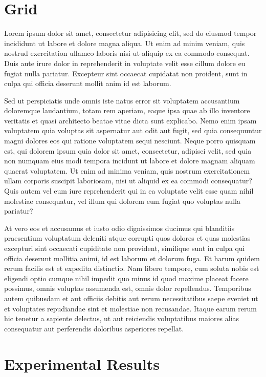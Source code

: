 \documentclass[ijoc,nonblindrev]{informs3} %
\begin{document}
\section{Grid}

Lorem ipsum dolor sit amet, consectetur adipisicing elit, sed do eiusmod
tempor incididunt ut labore et dolore magna aliqua. Ut enim ad minim
veniam, quis nostrud exercitation ullamco laboris nisi ut aliquip ex ea
commodo consequat. Duis aute irure dolor in reprehenderit in voluptate
velit esse cillum dolore eu fugiat nulla pariatur. Excepteur sint
occaecat cupidatat non proident, sunt in culpa qui officia deserunt
mollit anim id est laborum.

Sed ut perspiciatis unde omnis iste natus error sit voluptatem
accusantium doloremque laudantium, totam rem aperiam, eaque ipsa quae ab
illo inventore veritatis et quasi architecto beatae vitae dicta sunt
explicabo. Nemo enim ipsam voluptatem quia voluptas sit aspernatur aut
odit aut fugit, sed quia consequuntur magni dolores eos qui ratione
voluptatem sequi nesciunt. Neque porro quisquam est, qui dolorem ipsum
quia dolor sit amet, consectetur, adipisci velit, sed quia non numquam
eius modi tempora incidunt ut labore et dolore magnam aliquam quaerat
voluptatem. Ut enim ad minima veniam, quis nostrum exercitationem ullam
corporis suscipit laboriosam, nisi ut aliquid ex ea commodi consequatur?
Quis autem vel eum iure reprehenderit qui in ea voluptate velit esse
quam nihil molestiae consequatur, vel illum qui dolorem eum fugiat quo
voluptas nulla pariatur?

At vero eos et accusamus et iusto odio dignissimos ducimus qui
blanditiis praesentium voluptatum deleniti atque corrupti quos dolores
et quas molestias excepturi sint occaecati cupiditate non provident,
similique sunt in culpa qui officia deserunt mollitia animi, id est
laborum et dolorum fuga. Et harum quidem rerum facilis est et expedita
distinctio. Nam libero tempore, cum soluta nobis est eligendi optio
cumque nihil impedit quo minus id quod maxime placeat facere possimus,
omnis voluptas assumenda est, omnis dolor repellendus. Temporibus autem
quibusdam et aut officiis debitis aut rerum necessitatibus saepe eveniet
ut et voluptates repudiandae sint et molestiae non recusandae. Itaque
earum rerum hic tenetur a sapiente delectus, ut aut reiciendis
voluptatibus maiores alias consequatur aut perferendis doloribus
asperiores repellat.

\section{Experimental Results}
\end{document}
